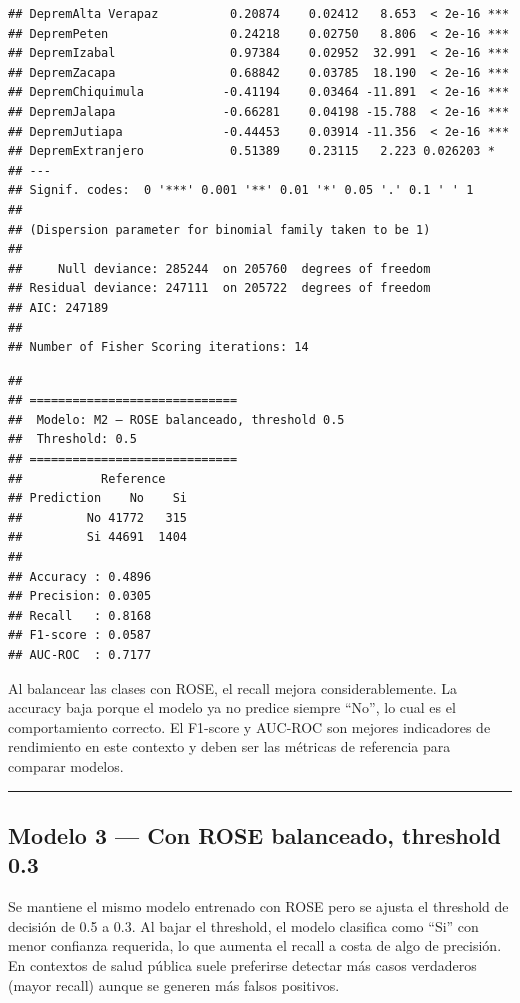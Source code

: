 \documentclass[
]{article}
\begin{document}
\begin{verbatim}
## DepremAlta Verapaz          0.20874    0.02412   8.653  < 2e-16 ***
## DepremPeten                 0.24218    0.02750   8.806  < 2e-16 ***
## DepremIzabal                0.97384    0.02952  32.991  < 2e-16 ***
## DepremZacapa                0.68842    0.03785  18.190  < 2e-16 ***
## DepremChiquimula           -0.41194    0.03464 -11.891  < 2e-16 ***
## DepremJalapa               -0.66281    0.04198 -15.788  < 2e-16 ***
## DepremJutiapa              -0.44453    0.03914 -11.356  < 2e-16 ***
## DepremExtranjero            0.51389    0.23115   2.223 0.026203 *  
## ---
## Signif. codes:  0 '***' 0.001 '**' 0.01 '*' 0.05 '.' 0.1 ' ' 1
## 
## (Dispersion parameter for binomial family taken to be 1)
## 
##     Null deviance: 285244  on 205760  degrees of freedom
## Residual deviance: 247111  on 205722  degrees of freedom
## AIC: 247189
## 
## Number of Fisher Scoring iterations: 14
\end{verbatim}

\begin{verbatim}
## 
## =============================
##  Modelo: M2 – ROSE balanceado, threshold 0.5 
##  Threshold: 0.5 
## =============================
##           Reference
## Prediction    No    Si
##         No 41772   315
##         Si 44691  1404
## 
## Accuracy : 0.4896 
## Precision: 0.0305 
## Recall   : 0.8168 
## F1-score : 0.0587 
## AUC-ROC  : 0.7177
\end{verbatim}

Al balancear las clases con ROSE, el recall mejora considerablemente. La
accuracy baja porque el modelo ya no predice siempre ``No'', lo cual es
el comportamiento correcto. El F1-score y AUC-ROC son mejores
indicadores de rendimiento en este contexto y deben ser las métricas de
referencia para comparar modelos.

\begin{center}\rule{0.5\linewidth}{0.5pt}\end{center}

\subsection{Modelo 3 --- Con ROSE balanceado, threshold
0.3}\label{modelo-3-con-rose-balanceado-threshold-0.3}

Se mantiene el mismo modelo entrenado con ROSE pero se ajusta el
threshold de decisión de 0.5 a 0.3. Al bajar el threshold, el modelo
clasifica como ``Si'' con menor confianza requerida, lo que aumenta el
recall a costa de algo de precisión. En contextos de salud pública suele
preferirse detectar más casos verdaderos (mayor recall) aunque se
generen más falsos positivos.
\end{document}
